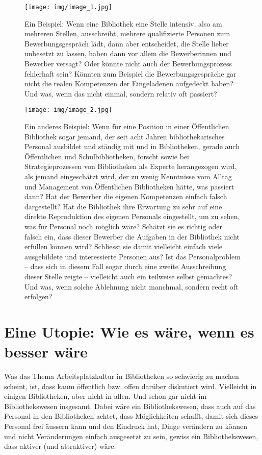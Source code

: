 \documentclass[a4paper,
fontsize=11pt,
oneside,
numbers=noperiodatend,
parskip=half-,
bibliography=totoc,
final
]{scrartcl}
\begin{document}
\begin{figure}
\centering
\texttt{[image: img/image\_1.jpg]}
\caption{Ein Beispiel: Wenn eine Bibliothek eine Stelle intensiv, also
am mehreren Stellen, ausschreibt, mehrere qualifizierte Personen zum
Bewerbungsgespräch lädt, dann aber entscheidet, die Stelle lieber
unbesetzt zu lassen, haben dann vor allem die Bewerberinnen und Bewerber
versagt? Oder könnte nicht auch der Bewerbungsprozess fehlerhaft sein?
Könnten zum Beispiel die Bewerbungsgespräche gar nicht die realen
Kompetenzen der Eingeladenen aufgedeckt haben? Und was, wenn das nicht
einmal, sondern relativ oft passiert?}
\end{figure}

\begin{figure}
\centering
\texttt{[image: img/image\_2.jpg]}
\caption{Ein anderes Beispiel: Wenn für eine Position in einer
Öffentlichen Bibliothek sogar jemand, der seit acht Jahren
bibliothekarisches Personal ausbildet und ständig mit und in
Bibliotheken, gerade auch Öffentlichen und Schulbibliotheken, forscht
sowie bei Strategieprozessen von Bibliotheken als Experte herangezogen
wird, als jemand eingeschätzt wird, der zu wenig Kenntnisse vom Alltag
und Management von Öffentlichen Bibliotheken hätte, was passiert dann?
Hat der Bewerber die eigenen Kompetenzen einfach falsch dargestellt? Hat
die Bibliothek ihre Erwartung zu sehr auf eine direkte Reproduktion des
eigenen Personals eingestellt, um zu sehen, was für Personal noch
möglich wäre? Schätzt sie es richtig oder falsch ein, dass dieser
Bewerber die Aufgaben in der Bibliothek nicht erfüllen können wird?
Schliesst sie damit vielleicht einfach viele ausgebildete und
interessierte Personen aus? Ist das Personalproblem -- dass sich in
diesem Fall sogar durch eine zweite Ausschreibung dieser Stelle zeigte
-- vielleicht auch ein teilweise selbst gemachtes? Und was, wenn solche
Ablehnung nicht manchmal, sondern recht oft erfolgen?}
\end{figure}

\hypertarget{eine-utopie-wie-es-wuxe4re-wenn-es-besser-wuxe4re}{%
\section*{Eine Utopie: Wie es wäre, wenn es besser
wäre}\label{eine-utopie-wie-es-wuxe4re-wenn-es-besser-wuxe4re}}

Was das Thema Arbeitsplatzkultur in Bibliotheken so schwierig zu machen
scheint, ist, dass kaum öffentlich bzw. offen darüber diskutiert wird.
Vielleicht in einigen Bibliotheken, aber nicht in allen. Und schon gar
nicht im Bibliothekswesen insgesamt. Dabei wäre ein Bibliothekswesen,
dass auch auf das Personal in den Bibliotheken achtet, dass
Möglichkeiten schafft, damit sich dieses Personal frei äussern kann und
den Eindruck hat, Dinge verändern zu können und nicht Veränderungen
einfach ausgesetzt zu sein, gewiss ein Bibliothekswesen, dass aktiver
(und attraktiver) wäre.
\end{document}
